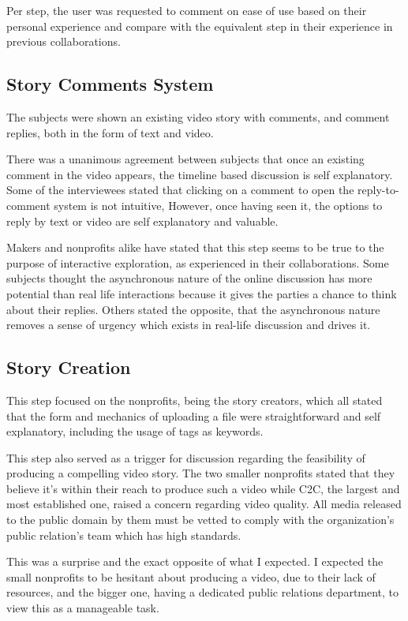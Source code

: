 Per step, the user was requested to comment on ease of use based on their personal experience and compare with the equivalent step in their experience in previous collaborations. 

\subsection{Story Comments System}

The subjects were shown an existing video story with comments, and comment replies, both in the form of text and video.

There was a unanimous agreement between subjects that once an existing comment in the video appears, the timeline based discussion is self explanatory. Some of the interviewees stated that clicking on a comment to open the reply-to-comment system is not intuitive, However, once having seen it, the options to reply by text or video are self explanatory and valuable.

Makers and nonprofits alike have stated that this step seems to be true to the purpose of interactive exploration, as experienced in their collaborations. Some subjects thought the asynchronous nature of the online discussion has more potential than real life interactions because it gives the parties a chance to think about their replies. Others stated the opposite, that the asynchronous nature removes a sense of urgency which exists in real-life discussion and drives it. 

\subsection{Story Creation}

This step focused on the nonprofits, being the story creators, which all stated that the form and mechanics of uploading a file were straightforward and self explanatory, including the usage of tags as keywords. 

This step also served as a trigger for discussion regarding the feasibility of producing a compelling video story. The two smaller nonprofits stated that they believe it's within their reach to produce such a video while C2C, the largest and most established one, raised a concern regarding video quality. All media released to the public domain by them must be vetted to comply with the organization's public relation's team which has high standards.

This was a surprise and the exact opposite of what I expected. I expected the small nonprofits to be hesitant about producing a video, due to their lack of resources, and the bigger one, having a dedicated public relations department, to view this as a manageable task.

